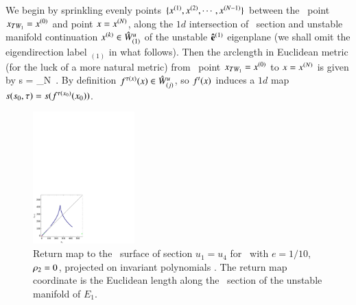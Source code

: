 We begin by sprinkling evenly points
$\{x^{(1)},x^{(2)},\cdots,x^{(N-1)}\}$ between the
\reqv\ point $x_{TW_{1}}=x^{(0)}$ and point  $x=
x^{(N)}$, along the $1d$ intersection of \Poincare\ section and
unstable manifold continuation $x^{(k)} \in \hat{W}^u_{(1)}$ of the unstable ${\bf
\hat{e}}^{(1)}$ eigen\-plane (we shall omit the
eigen\-direction label ${}_{(1)}$ in what follows). Then the
arclength in Euclidean metric (for the luck of a more natural metric)
from \reqv\ point $x_{TW_{1}}=x^{(0)}$ to $x=
x^{(N)}$ is given by
\beq
s = \lim_{N\to\infty}
\,.
By definition $f^{\tau(x)}(x) \in \hat{W}^u_{(j)}$, so
$f^t(x)$ induces a $1d$ map $s(s_0,\tau) =
s(f^{\tau({x_0})}({x_0}))$.

\begin{figure}[ht]
\begin{center}
\includegraphics[width=0.35\textwidth]{../figs/CLEipRM}
\end{center}
\caption[Return map for Complex Lorenz flow, invariant polynomials]
{Return map to the \Poincare\
surface of section $u_1=u_4$ for \cLe\ with $e=1/10$, $\rho_2=0$,
projected on invariant polynomials \refeq{eq:ipLaser}.
The return map coordinate is the Euclidean
length along the \Poincare\ section of the unstable manifold of $E_1$.
    }
\label{fig:CLEipRM}
\end{figure}


